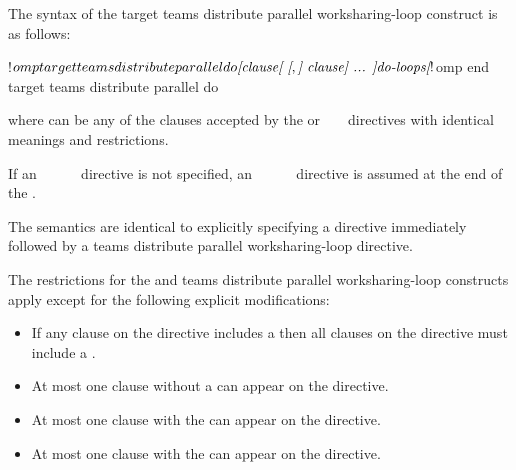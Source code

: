 \begin{fortranspecific}
The syntax of the target teams distribute parallel worksharing-loop construct is as follows:

\begin{ompfPragma}
!$omp target teams distribute parallel do \plc{[clause[ [},\plc{] clause] ... ]}
    \plc{do-loops}
\plc{[}!$omp end target teams distribute parallel do\plc{]}
\end{ompfPragma}

where  can be any of the clauses accepted by the  or
~ ~ directives with
identical meanings and restrictions.

If an ~~~~~ directive is not specified, an
~~~~~
directive is assumed at the end of the .
\end{fortranspecific}

\descr
The semantics are identical to explicitly specifying a 
directive immediately followed by a teams distribute parallel worksharing-loop directive.


\restrictions
The restrictions for the  and teams distribute parallel
worksharing-loop constructs apply except for the following explicit modifications:

\begin{itemize}
\item If any  clause on the directive includes a
       then all  clauses
      on the directive must include a .

\item At most one  clause without a
       can appear on the directive.

\item At most one  clause with the 
       can appear on the directive.

\item At most one  clause with the 
       can appear on the directive.
\end{itemize}


